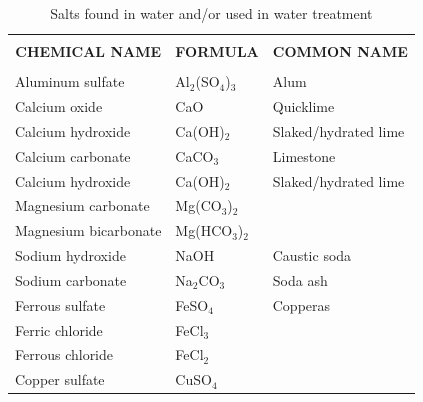 \documentclass{article}
\begin{document}
     \begin{table}[h!]    
\begin{center}
     \begin{tabular}{ | m{5cm}  m{4cm}  m{4cm} |}
     \hline
           \multicolumn{1}{|c}{} & \multicolumn{1}{c}{} & \multicolumn{1}{c|}{}\\
      \multicolumn{1}{|c}{\textbf{CHEMICAL NAME}} & \multicolumn{1}{c}{\textbf{FORMULA}} & \multicolumn{1}{c|}{\textbf{COMMON NAME}}\\
            \multicolumn{1}{|c}{} & \multicolumn{1}{c}{} & \multicolumn{1}{c|}{}\\
      Aluminum sulfate & Al$_2$(SO$_4$)$_3$ & Alum\\
      Calcium oxide & Ca$ $O$ $ $ $ & Quicklime\\
      Calcium hydroxide & Ca$ $(OH$ $)$_2$ & Slaked/hydrated lime\\
      Calcium carbonate & Ca$ $CO$_3$ $ $ & Limestone\\
      Calcium hydroxide & Ca$ $(OH$ $)$_2$ & Slaked/hydrated lime\\
      Magnesium carbonate & Mg$ $(CO$_3$)$_2$ & \\
      Magnesium bicarbonate & Mg$ $(HCO$_3$)$_2$ & \\
      Sodium hydroxide & Na$ $OH$ $ $ $ & Caustic soda\\
      Sodium carbonate & Na$_2$CO$_3$ $ $ & Soda ash\\
      Ferrous sulfate & Fe$ $SO$_4$ $ $ & Copperas \\
      Ferric chloride & Fe$ $Cl$_3$ $ $ & \\
      Ferrous chloride & Fe$ $Cl$_2$ $ $ & \\
      Copper sulfate & Cu$ $SO$_4$ $ $ &\\

          \hline
                    \end{tabular}
     \caption{Salts found in water and/or used in water treatment}
     \label{Salts found in water and/or used in water treatment}
     
\end{center}
     \end{table}
     
\end{document}
